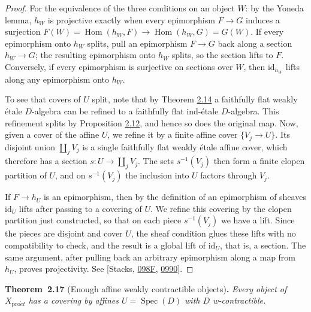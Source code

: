 \documentclass[11pt]{article}
\newenvironment{bpstatement}[2]{\par\addvspace{0.6\baselineskip}\noindent\textbf{#1}#2\textbf{.}\enspace\ignorespaces}
  {\par\addvspace{0.4\baselineskip}}
\newenvironment{bpstatementit}[2]{\begin{bpstatement}{#1}{#2}\itshape\ignorespaces}{\end{bpstatement}}
\providecommand{\Hom}{}\renewcommand{\Hom}{\operatorname{Hom}}
\begin{document}
\begin{proof}[{Proof}]\label{bp50}%
For the equivalence of the three conditions on an object \(W\): by the Yoneda lemma, \(h_W\) is projective exactly when every epimorphism \(F\to G\) induces a surjection \(F(W)=\Hom(h_W,F)\to\Hom(h_W,G)=G(W)\). If every epimorphism onto \(h_W\) splits, pull an epimorphism \(F\to G\) back along a section \(h_W\to G\); the resulting epimorphism onto \(h_W\) splits, so the section lifts to \(F\). Conversely, if every epimorphism is surjective on sections over \(W\), then \(\mathrm{id}_{h_W}\) lifts along any epimorphism onto \(h_W\).

To see that covers of \(U\) split, note that by Theorem \hyperref[bp42]{2.14} a faithfully flat weakly étale \(D\)-algebra can be refined to a faithfully flat ind-étale \(D\)-algebra. This refinement splits by Proposition \hyperref[bp36]{2.12}, and hence so does the original map. Now, given a cover of the affine \(U\), we refine it by a finite affine cover \(\{V_j\to U\}\). Its disjoint union \(\coprod_jV_j\) is a single faithfully flat weakly étale affine cover, which therefore has a section \(s:U\to\coprod_jV_j\). The sets \(s^{-1}(V_j)\) then form a finite clopen partition of \(U\), and on \(s^{-1}(V_j)\) the inclusion into \(U\) factors through \(V_j\).

If \(F\to h_U\) is an epimorphism, then by the definition of an epimorphism of sheaves \(\mathrm{id}_U\) lifts after passing to a covering of \(U\). We refine this covering by the clopen partition just constructed, so that on each piece \(s^{-1}(V_j)\) we have a lift. Since the pieces are disjoint and cover \(U\), the sheaf condition glues these lifts with no compatibility to check, and the result is a global lift of \(\mathrm{id}_U\), that is, a section. The same argument, after pulling back an arbitrary epimorphism along a map from \(h_U\), proves projectivity. See [Stacks, \href{https://stacks.math.columbia.edu/tag/098F}{098F}, \href{https://stacks.math.columbia.edu/tag/0990}{0990}].
\end{proof}

\label{bp51}%
\begin{bpstatementit}{Theorem~2.17}{ (Enough affine weakly contractible objects)}
Every object of \(X_{\mathrm{pro}\acute{e}t}\) has a covering by affines \(U=\operatorname{Spec}(D)\) with \(D\) w-contractible.
\end{bpstatementit}
\end{document}
